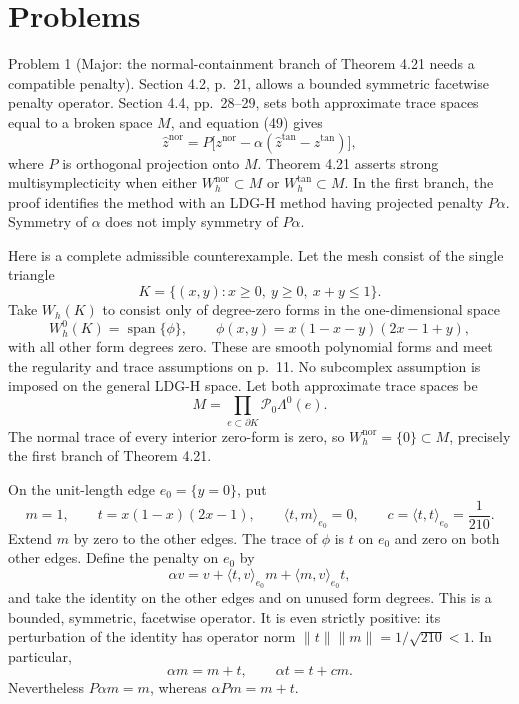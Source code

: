 \documentclass[10pt]{article}
\begin{document}
\section*{Problems}
Problem 1 (Major: the normal-containment branch of Theorem 4.21 needs a compatible penalty).  Section 4.2, p. 21, allows a bounded symmetric facetwise penalty operator. Section 4.4, pp. 28–29, sets both approximate trace spaces equal to a broken space \(M\), and equation (49) gives \[\widehat z^\mathrm{nor}=P\bigl[z^\mathrm{nor}-\alpha(\widehat z^\mathrm{tan}-z^\mathrm{tan})\bigr],\] where \(P\) is orthogonal projection onto \(M\). Theorem 4.21 asserts strong multisymplecticity when either \(W_h^\mathrm{nor}\subset M\) or \(W_h^\mathrm{tan}\subset M\). In the first branch, the proof identifies the method with an LDG-H method having projected penalty \(P\alpha\). Symmetry of \(\alpha\) does not imply symmetry of \(P\alpha\).\par
Here is a complete admissible counterexample. Let the mesh consist of the single triangle \[K=\{(x,y):x\geq0,\ y\geq0,\ x+y\leq1\}.\] Take \(W_h(K)\) to consist only of degree-zero forms in the one-dimensional space \[W_h^0(K)=\mathop{\mathrm{span}}\{\phi\},\qquad
 \phi(x,y)=x(1-x-y)(2x-1+y),\] with all other form degrees zero. These are smooth polynomial forms and meet the regularity and trace assumptions on p. 11. No subcomplex assumption is imposed on the general LDG-H space. Let both approximate trace spaces be \[M=\prod_{e\subset\partial K}\mathcal P_0\Lambda^0(e).\] The normal trace of every interior zero-form is zero, so \(W_h^\mathrm{nor}=\{0\}\subset M\), precisely the first branch of Theorem 4.21.\par
On the unit-length edge \(e_0=\{y=0\}\), put \[m=1,\qquad t=x(1-x)(2x-1),\qquad
 \langle t,m\rangle_{e_0}=0,\qquad c=\langle t,t\rangle_{e_0}=\frac1{210}.\] Extend \(m\) by zero to the other edges. The trace of \(\phi\) is \(t\) on \(e_0\) and zero on both other edges. Define the penalty on \(e_0\) by \[\alpha v=v+\langle t,v\rangle_{e_0}m+\langle m,v\rangle_{e_0}t,\] and take the identity on the other edges and on unused form degrees. This is a bounded, symmetric, facetwise operator. It is even strictly positive: its perturbation of the identity has operator norm \(\|t\|\|m\|=1/\sqrt{210}<1\). In particular, \[\alpha m=m+t,\qquad \alpha t=t+cm.\] Nevertheless \(P\alpha m=m\), whereas \(\alpha Pm=m+t\).\par
\end{document}
